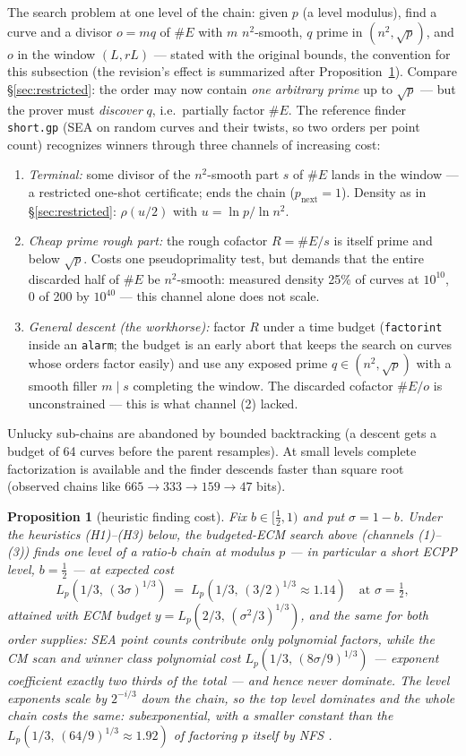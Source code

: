 \documentclass[11pt]{amsart}
\newcommand{\Lp}[2]{L_{p}\!\left(#1,\,#2\right)}
\theoremstyle{plain}
\newtheorem{proposition}[theorem]{Proposition}
\theoremstyle{definition}
\theoremstyle{remark}
\begin{document}
The search problem at one level of the chain: given $p$ (a level modulus), find a curve and a divisor
$o = mq$ of $\#E$ with $m$ $n^2$-smooth, $q$ prime in $(n^2, \sqrt p)$, and $o$ in the window
$(L, rL)$ --- stated with the original bounds, the convention for this subsection (the revision's
effect is summarized after Proposition~\ref{prop:shortfind}).  Compare \S\ref{sec:restricted}: the order may now contain \emph{one arbitrary prime} up to
$\sqrt p$ --- but the prover must \emph{discover} $q$, i.e.\ partially factor $\#E$.  The reference
finder \texttt{short.gp} \cite{Short} (SEA on random curves and their twists, so two orders per point
count) recognizes winners through three channels of increasing cost:
\begin{enumerate}
\item \emph{Terminal:} some divisor of the $n^2$-smooth part $s$ of $\#E$ lands in the window --- a
restricted one-shot certificate; ends the chain ($p_{\text{next}} = 1$).  Density as in
\S\ref{sec:restricted}: $\rho(u/2)$ with $u = \ln p/\ln n^2$.
\item \emph{Cheap prime rough part:} the rough cofactor $R = \#E/s$ is itself prime and below
$\sqrt p$.  Costs one pseudoprimality test, but demands that the entire discarded half of $\#E$ be
$n^2$-smooth: measured density 25\% of curves at $10^{10}$, 0 of 200 by $10^{40}$ --- this channel
alone does not scale.
\item \emph{General descent (the workhorse):} factor $R$ under a time budget (\texttt{factorint}
inside an \texttt{alarm}; the budget is an early abort that keeps the search on curves whose orders
factor easily) and use any exposed prime $q \in (n^2, \sqrt p)$ with a smooth filler $m \mid s$
completing the window.  The discarded cofactor $\#E/o$ is unconstrained --- this is what channel (2)
lacked.
\end{enumerate}
Unlucky sub-chains are abandoned by bounded backtracking (a descent gets a budget of 64 curves before
the parent resamples).  At small levels complete factorization is available and the finder
descends faster than square root (observed chains like $665 \to 333 \to 159 \to 47$ bits).

\begin{proposition}[heuristic finding cost]\label{prop:shortfind}
Fix $b \in [\tfrac12, 1)$ and put $\sigma = 1-b$.  Under the heuristics (H1)--(H3) below, the
budgeted-ECM search above (channels (1)--(3)) finds one level of a ratio-$b$ chain at modulus $p$ ---
in particular a short ECPP level, $b = \tfrac12$ --- at expected cost
\[
  \Lp{1/3}{(3\sigma)^{1/3}}
  \;=\; \Lp{1/3}{(3/2)^{1/3} \approx 1.14}\quad\text{at } \sigma = \tfrac12,
\]
attained with ECM budget $y = \Lp{2/3}{(\sigma^2/3)^{1/3}}$, and the same for both order supplies:
SEA point counts contribute only polynomial factors, while the CM scan and winner class polynomial
cost $\Lp{1/3}{(8\sigma/9)^{1/3}}$ --- exponent coefficient exactly two thirds of the total --- and
hence never dominate.  The level exponents scale by $2^{-i/3}$ down the chain, so the top level
dominates and the whole chain costs the same: subexponential, with a smaller constant than the
$\Lp{1/3}{(64/9)^{1/3} \approx 1.92}$ of factoring $p$ itself by NFS \cite{LL93}.
\end{proposition}
\end{document}
